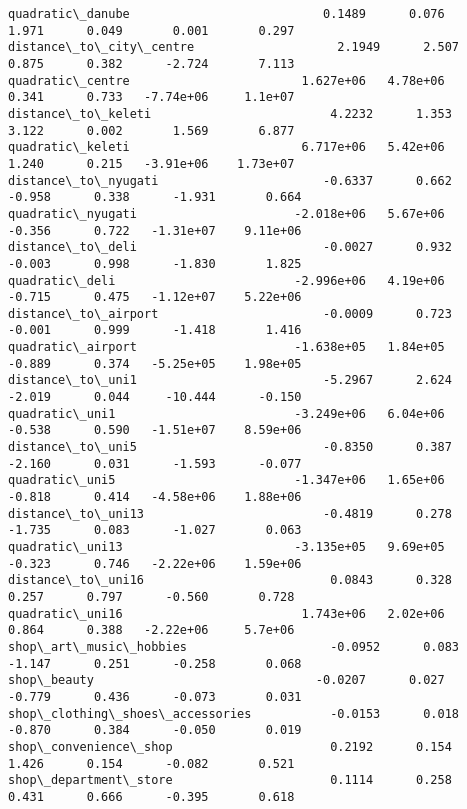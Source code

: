 \documentclass[11pt]{article}
\begin{document}
\begin{Verbatim}[commandchars=\\\{\}]
quadratic\_danube                           0.1489      0.076      1.971      0.049       0.001       0.297
distance\_to\_city\_centre                    2.1949      2.507      0.875      0.382      -2.724       7.113
quadratic\_centre                        1.627e+06   4.78e+06      0.341      0.733   -7.74e+06     1.1e+07
distance\_to\_keleti                         4.2232      1.353      3.122      0.002       1.569       6.877
quadratic\_keleti                        6.717e+06   5.42e+06      1.240      0.215   -3.91e+06    1.73e+07
distance\_to\_nyugati                       -0.6337      0.662     -0.958      0.338      -1.931       0.664
quadratic\_nyugati                      -2.018e+06   5.67e+06     -0.356      0.722   -1.31e+07    9.11e+06
distance\_to\_deli                          -0.0027      0.932     -0.003      0.998      -1.830       1.825
quadratic\_deli                         -2.996e+06   4.19e+06     -0.715      0.475   -1.12e+07    5.22e+06
distance\_to\_airport                       -0.0009      0.723     -0.001      0.999      -1.418       1.416
quadratic\_airport                      -1.638e+05   1.84e+05     -0.889      0.374   -5.25e+05    1.98e+05
distance\_to\_uni1                          -5.2967      2.624     -2.019      0.044     -10.444      -0.150
quadratic\_uni1                         -3.249e+06   6.04e+06     -0.538      0.590   -1.51e+07    8.59e+06
distance\_to\_uni5                          -0.8350      0.387     -2.160      0.031      -1.593      -0.077
quadratic\_uni5                         -1.347e+06   1.65e+06     -0.818      0.414   -4.58e+06    1.88e+06
distance\_to\_uni13                         -0.4819      0.278     -1.735      0.083      -1.027       0.063
quadratic\_uni13                        -3.135e+05   9.69e+05     -0.323      0.746   -2.22e+06    1.59e+06
distance\_to\_uni16                          0.0843      0.328      0.257      0.797      -0.560       0.728
quadratic\_uni16                         1.743e+06   2.02e+06      0.864      0.388   -2.22e+06     5.7e+06
shop\_art\_music\_hobbies                    -0.0952      0.083     -1.147      0.251      -0.258       0.068
shop\_beauty                               -0.0207      0.027     -0.779      0.436      -0.073       0.031
shop\_clothing\_shoes\_accessories           -0.0153      0.018     -0.870      0.384      -0.050       0.019
shop\_convenience\_shop                      0.2192      0.154      1.426      0.154      -0.082       0.521
shop\_department\_store                      0.1114      0.258      0.431      0.666      -0.395       0.618

\end{Verbatim}
\end{document}
